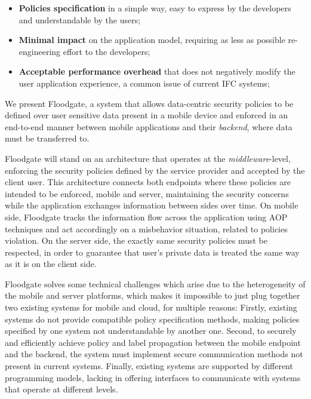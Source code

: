 \begin{itemize}
  
  \item \textbf{Policies specification} in a simple way, easy to express by the developers and understandable by the users;
        
  \item \textbf{Minimal impact} on the application model, requiring as less as possible re-engineering effort to the developers;
    
  \item \textbf{Acceptable performance overhead} that does not negatively modify the user application experience, a common issue of current IFC systems;

\end{itemize}

We present Floodgate, a system that allows data-centric security policies to be defined over user sensitive data present in a mobile device and enforced in an end-to-end manner between mobile applications and their \textit{backend}, where data must be transferred to.

Floodgate will stand on an architecture that operates at the \textit{middleware}-level, enforcing the security policies defined by the service provider and accepted by the client user. This architecture connects both endpoints where these policies are intended to be enforced, mobile and server, maintaining the security concerns while the application exchanges information between sides over time. On mobile side, Floodgate tracks the information flow across the application using AOP techniques and act accordingly on a misbehavior situation, related to policies violation. On the server side, the exactly same security policies must be respected, in order to guarantee that user's private data is treated the same way as it is on the client side.

Floodgate solves some technical challenges which arise due to the heterogeneity of the mobile and server platforms, which makes it impossible to just plug together two existing systems for mobile and cloud, for multiple reasons: Firstly, existing systems do not provide compatible policy specification methods, making policies specified by one system not understandable by another one. Second, to securely and efficiently achieve policy and label propagation between the mobile endpoint and the backend, the system must implement secure communication methods not present in current systems. Finally, existing systems are supported by different programming models, lacking in offering interfaces to communicate with systems that operate at different levels.

